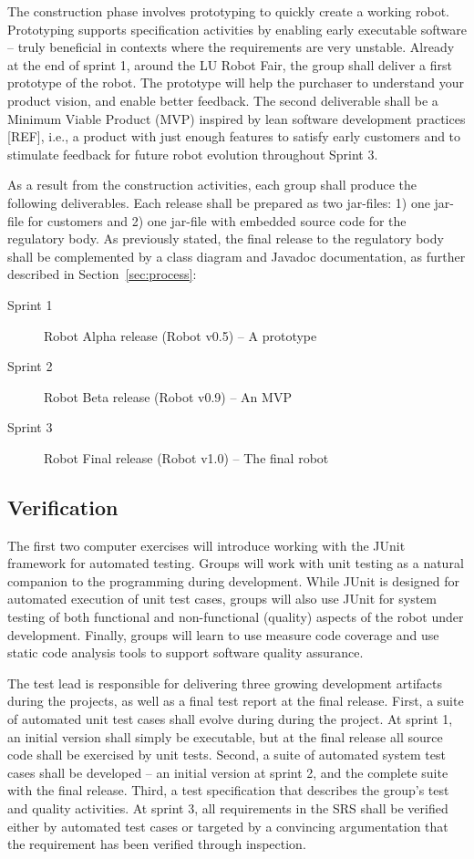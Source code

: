 \documentclass{scrreprt}
\begin{document}
\begin{description}
\end{description}

The construction phase involves prototyping to quickly create a working robot. Prototyping supports specification activities by enabling early executable software -- truly beneficial in contexts where the requirements are very unstable. Already at the end of sprint 1, around the LU Robot Fair, the group shall deliver a first prototype of the robot. The prototype will help the purchaser to understand your product vision, and enable better feedback. The second deliverable shall be a Minimum Viable Product (MVP) inspired by lean software development practices [REF], i.e., a product with just enough features to satisfy early customers and to stimulate feedback for future robot evolution throughout Sprint 3. 

As a result from the construction activities, each group shall produce the following deliverables. Each release shall be prepared as two jar-files: 1) one jar-file for customers and 2) one jar-file with embedded source code for the regulatory body. As previously stated, the final release to the regulatory body shall be complemented by a class diagram and Javadoc documentation, as further described in Section~\ref{sec:process}:
\begin{description}
\item[Sprint 1] Robot Alpha release (Robot v0.5) -- A prototype
\item[Sprint 2] Robot Beta release (Robot v0.9) -- An MVP
\item[Sprint 3] Robot Final release (Robot v1.0) -- The final robot
\end{description}

\subsection{Verification}
The first two computer exercises will introduce working with the JUnit framework for automated testing. Groups will work with unit testing as a natural companion to the programming during development. While JUnit is designed for automated execution of unit test cases, groups will also use JUnit for system testing of both functional and non-functional (quality) aspects of the robot under development. Finally, groups will learn to use measure code coverage and use static code analysis tools to support software quality assurance.

The test lead is responsible for delivering three growing development artifacts during the projects, as well as a final test report at the final release. First, a suite of automated unit test cases shall evolve during during the project. At sprint 1, an initial version shall simply be executable, but at the final release all source code shall be exercised by unit tests. Second, a suite of automated system test cases shall be developed -- an initial version at sprint 2, and the complete suite with the final release. Third, a test specification that describes the group's test and quality activities. At sprint 3, all requirements in the SRS shall be verified either by automated test cases or targeted by a convincing argumentation that the requirement has been verified through inspection.
\end{document}
